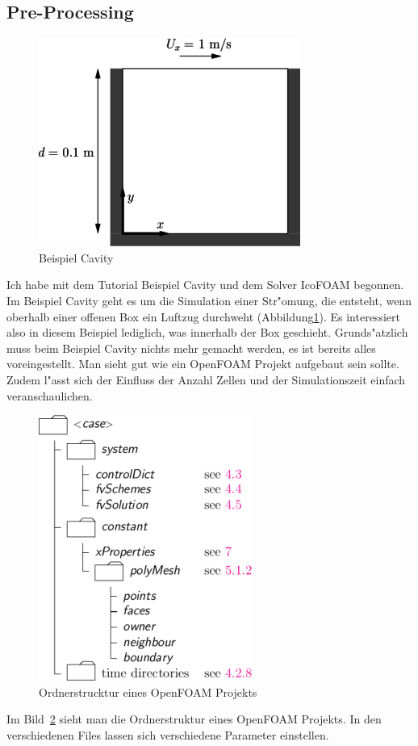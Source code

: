 \begin{refsection}
\subsection{Pre-Processing}
\begin{figure}
\begin{center}
\includegraphics[width =  0.5\linewidth]{./openfoam/pics/cavity1.png} 
\end{center}
\caption{Beispiel Cavity \cite{of}\label{of:cavity}}
\end{figure} 
Ich habe mit dem Tutorial Beispiel Cavity und dem Solver IcoFOAM
begonnen. Im Beispiel Cavity geht es um die Simulation einer Str"omung,
die entsteht, wenn oberhalb einer offenen Box ein Luftzug durchweht
(Abbildung\ref{of:cavity}). Es
interessiert also in diesem Beispiel lediglich, was innerhalb der Box
geschieht. Grunds"atzlich muss beim Beispiel Cavity nichts mehr gemacht
werden, es ist bereits alles voreingestellt. Man sieht gut wie ein
OpenFOAM Projekt aufgebaut sein sollte. Zudem l"asst sich der Einfluss
der Anzahl Zellen und der Simulationszeit einfach veranschaulichen.


\begin{figure}
\begin{center}
\includegraphics[width =  0.4\hsize]{./openfoam/pics/Struktur.png}
\end{center}
\caption{Ordnerstrucktur eines OpenFOAM Projekts \cite{of}\label{of:struktur}}
\end{figure}
Im Bild~\ref{of:struktur} sieht man die Ordnerstruktur eines OpenFOAM Projekts.
In den verschiedenen Files lassen sich verschiedene Parameter einstellen.


\end{refsection}
